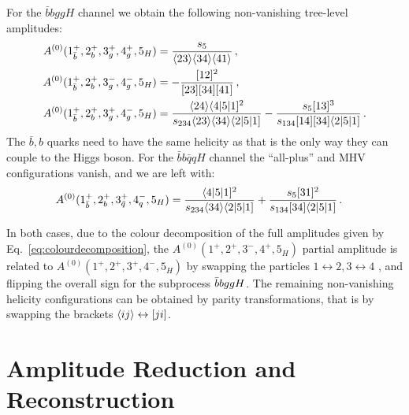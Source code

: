\documentclass[main.tex]{subfiles}
\begin{document}
For the $\bar{b} b g g H$ channel we obtain the following non-vanishing tree-level amplitudes:
\begin{align} \label{eq:A0bbggh}
	A^{(0)}(1^+_{\bar{b}},2^+_{b},3^+_g,4^+_g,5_{H}) &=  \frac{s_5}{\langle23\rangle \langle34\rangle \langle41\rangle} \,, \\
	A^{(0)}(1^+_{\bar{b}},2^+_{b},3^-_g,4^-_g,5_{H}) &= -\frac{[12]^2}{[23][34][41]} \,, \\
	A^{(0)}(1^+_{\bar{b}},2^+_{b},3^+_g,4^-_g,5_{H}) &= \frac{\langle24\rangle \langle4|5|1]^2}{s_{234} \langle23\rangle \langle34\rangle \langle2|5|1]}-\frac{s_5 [13]^3}{s_{134} [14] [34] \langle2|5|1]} \,.
\end{align}
The $\bar{b},b$ quarks need to have the same helicity as that is the only way they can couple to the Higgs boson. 
For the $\bar{b} b \bar{q} q H$ channel the ``all-plus'' and MHV configurations vanish, and we are left with:
\begin{align} \label{eq:A0bbqqh}
	A^{(0)}(1^+_{\bar b},2^+_{b},3^+_{\bar q},4^-_{q},5_{H}) &=  \frac{\langle4|5|1]^2}{s_{234} \langle34\rangle \langle2|5|1]}+\frac{s_5 [31]^2}{s_{134} [34] \langle2|5|1]} \,. 
\end{align}

In both cases, due to the colour decomposition of the full amplitudes given by Eq.~\ref{eq:colourdecomposition}, the $A^{(0)}(1^+,2^+,3^-,4^+,5_{H})$ partial amplitude is related to $A^{(0)}(1^+,2^+,3^+,4^-,5_{H})$ by swapping the particles $1\leftrightarrow 2,3\leftrightarrow 4$ , and flipping the overall sign for the subprocess $\bar{b}bggH$. The remaining non-vanishing helicity configurations can be obtained by parity transformations, that is by swapping the brackets $\langle ij \rangle \leftrightarrow [ji]$.

\section{Amplitude Reduction and Reconstruction}
\label{Hbbsec:reduction}
\end{document}
